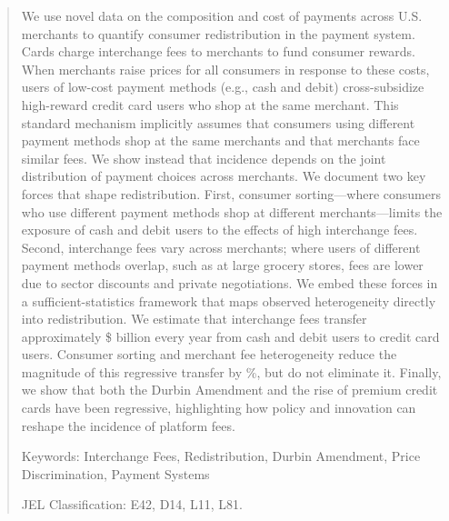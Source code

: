 \documentclass[11pt,english]{article}
\begin{document}
\begin{abstract}
\begin{singlespace}

  We use novel data on the composition and cost of payments across U.S. merchants to quantify consumer redistribution in the payment system.
  Cards charge interchange fees to merchants to fund consumer rewards.
  When merchants raise prices for all consumers in response to these costs, users of low-cost payment methods (e.g., cash and debit) cross-subsidize high-reward credit card users who shop at the same merchant.
  This standard mechanism implicitly assumes that consumers using different payment methods shop at the same merchants and that merchants face similar fees. 
  We show instead that incidence depends on the joint distribution of payment choices across merchants.
  We document two key forces that shape redistribution.
  First, consumer sorting---where consumers who use different payment methods shop at different merchants---limits the exposure of cash and debit users to the effects of high interchange fees.
  Second, interchange fees vary across merchants; where users of different payment methods overlap, such as at large grocery stores, fees are lower due to sector discounts and private negotiations.
  We embed these forces in a sufficient-statistics framework that maps observed heterogeneity directly into redistribution.
  We estimate that interchange fees transfer approximately \$ billion every year from cash and debit users to credit card users.
  Consumer sorting and merchant fee heterogeneity reduce the magnitude of this regressive transfer by \%, but do not eliminate it.
  Finally, we show that both the Durbin Amendment and the rise of premium credit cards have been regressive, highlighting how policy and innovation can reshape the incidence of platform fees.

\end{singlespace}

\thispagestyle{empty} \setcounter{page}{0}\begin{flushleft}

Keywords: Interchange Fees, Redistribution, Durbin Amendment, Price Discrimination, Payment Systems

JEL Classification: E42, D14, L11, L81.\end{flushleft}

\end{abstract}
\clearpage{}
\end{document}
